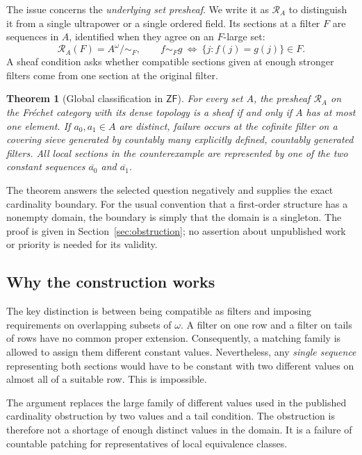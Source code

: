 \documentclass[11pt,letterpaper]{article}
\newtheorem{theorem}{Theorem}[section]
\theoremstyle{definition}
\theoremstyle{remark}
\newcommand{\om}{\omega}
\newcommand{\RA}{\mathscr R_A}
\newcommand{\const}[1]{\overline{#1}}
\newcommand{\ZF}{\mathsf{ZF}}
\begin{document}
The issue concerns the \emph{underlying set presheaf}. We write it as
$\RA$ to distinguish it from a single ultrapower or a single ordered field.
Its sections at a filter $F$ are sequences in $A$, identified when they
agree on an $F$-large set:
\begin{equation}\label{eq:presheaf-intro}
 \RA(F)=A^\om/{\sim_F},\qquad
 f\sim_F g\ \Longleftrightarrow\ \{j:f(j)=g(j)\}\in F.
\end{equation}
A sheaf condition asks whether compatible sections given at enough stronger
filters come from one section at the original filter.

\begin{theorem}[Global classification in $\ZF$]\label{thm:main}
For every set $A$, the presheaf $\RA$ on the Fr\'echet category with its
dense topology is a sheaf if and only if $A$ has at most one element.
If $a_0,a_1\in A$ are distinct, failure occurs at the cofinite filter on a
covering sieve generated by countably many explicitly defined, countably
generated filters. All local sections in the counterexample are represented
by one of the two constant sequences $\const{a_0}$ and $\const{a_1}$.
\end{theorem}

The theorem answers the selected question negatively and supplies the exact
cardinality boundary. For the usual convention that a first-order structure
has a nonempty domain, the boundary is simply that the domain is a
singleton. The proof is given in Section~\ref{sec:obstruction}; no assertion
about unpublished work or priority is needed for its validity.

\subsection{Why the construction works}
The key distinction is between being compatible as filters and imposing
requirements on overlapping subsets of $\om$. A filter on one row and a
filter on tails of rows have no common proper extension. Consequently, a
matching family is allowed to assign them different constant values.
Nevertheless, any \emph{single sequence} representing both sections would
have to be constant with two different values on almost all of a suitable
row. This is impossible.

The argument replaces the large family of different values used in the
published cardinality obstruction by two values and a tail condition. The
obstruction is therefore not a shortage of enough distinct values in the
domain. It is a failure of countable patching for representatives of local
equivalence classes.
\end{document}
